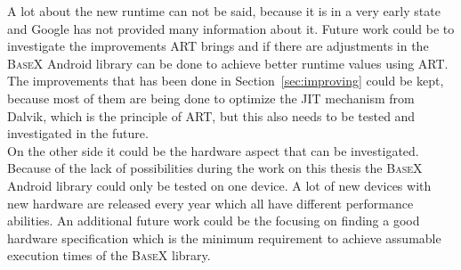 A lot about the new runtime can not be said, because it is in a very early state and Google has not provided many information about it.
Future work could be to investigate the improvements ART brings and if there are adjustments in the \textsc{BaseX} Android library can be done to achieve better runtime values using ART.
The improvements that has been done in Section~\ref{sec:improving} could be kept, because most of them are being done to optimize the JIT mechanism from Dalvik, which is the principle of ART, but this also needs to be tested and investigated in the future.\\
On the other side it could be the hardware aspect that can be investigated.
Because of the lack of possibilities during the work on this thesis the \textsc{BaseX} Android library could only be tested on one device.
A lot of new devices with new hardware are released every year which all have different performance abilities.
An additional future work could be the focusing on finding a good hardware specification which is the minimum requirement to achieve assumable execution times of the \textsc{BaseX} library.
